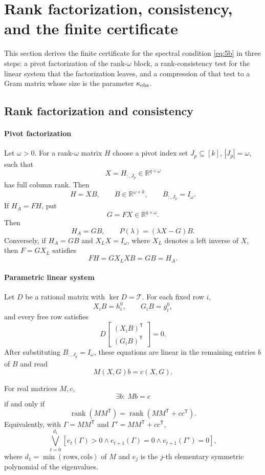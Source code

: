 \section{Rank factorization, consistency, and the finite certificate}\label{sec:certificate}

This section derives the finite certificate for the spectral condition
\eqref{eq:5b} in three steps: a pivot factorization of the rank-$\omega$
block, a rank-consistency test for the linear system that the factorization
leaves, and a compression of that test to a Gram matrix whose size is the
parameter $\kappa_{\rm obs}$.

\subsection{Rank factorization and consistency}\label{sec:consistency}

\paragraph*{Pivot factorization}\label{sec:pivot}
Let $\omega>0$. For a rank-$\omega$ matrix $H$ choose a pivot index set
$J_{p}\subseteq[k]$, $|J_{p}|=\omega$, such that
\[
X=H_{:,J_{p}}\in\mathbb R^{q\times\omega}
\]
has full column rank. Then
\[
H=XB,\qquad B\in\mathbb R^{\omega\times k},\qquad B_{:,J_p}=I_\omega .
\]
If $H_A=FH$, put
\[
G=FX\in\mathbb R^{q\times\omega}.
\]
Then
\[
H_A=GB,\qquad P(\lambda)=(\lambda X-G)B .
\]
Conversely, if $H_A=GB$ and $X_LX=I_\omega$, where $X_L$ denotes a left
inverse of $X$, then $F=GX_L$ satisfies
\[
FH=GX_LXB=GB=H_A .
\]

\paragraph*{Parametric linear system}\label{sec:param}
Let $D$ be a rational matrix with $\ker D=\mathcal T$. For each fixed row
$i$,
\[
X_iB=h_i^0,\qquad G_iB=g_i^0,
\]
and every free row satisfies
\[
D\begin{bmatrix}(X_iB)^{\mathsf T}\\ (G_iB)^{\mathsf T}\end{bmatrix}=0.
\]
After substituting $B_{:,J_p}=I_\omega$, these equations are linear in the
remaining entries $b$ of $B$ and read
\[
M(X,G)b=c(X,G).
\]

\begin{lem}\label{lem:rankcons}
	For real matrices $M,c$,
	\[
	\exists b:\ Mb=c
	\]
	if and only if
	\[
	\operatorname{rank}(MM^{\mathsf T})
	=\operatorname{rank}(MM^{\mathsf T}+cc^{\mathsf T}).
	\]
	Equivalently, with $\Gamma=MM^{\mathsf T}$ and
	$\Gamma'=MM^{\mathsf T}+cc^{\mathsf T}$,
	\[
	\bigvee_{t=0}^{d_1}
	\left[e_t(\Gamma)>0\wedge e_{t+1}(\Gamma)=0\wedge e_{t+1}(\Gamma')=0\right],
	\]
	where $d_1=\min(\text{rows},\text{cols})$ of $M$ and $e_j$ is the
	$j$-th elementary symmetric polynomial of the eigenvalues.
\end{lem}

